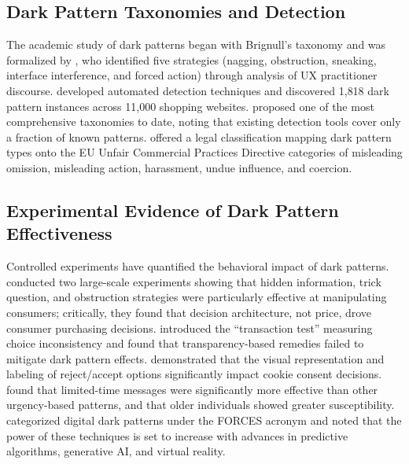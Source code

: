 \documentclass[a4paper]{article}
\begin{document}
\subsection{Dark Pattern Taxonomies and Detection}
The academic study of dark patterns began with Brignull's taxonomy \citep{brignull2010} and was formalized by \citet{gray2018}, who identified five strategies (nagging, obstruction, sneaking, interface interference, and forced action) through analysis of UX practitioner discourse. \citet{mathur2019} developed automated detection techniques and discovered 1{,}818 dark pattern instances across 11{,}000 shopping websites. \citet{li2024} proposed one of the most comprehensive taxonomies to date, noting that existing detection tools cover only a fraction of known patterns. \citet{isola2025} offered a legal classification mapping dark pattern types onto the EU Unfair Commercial Practices Directive categories of misleading omission, misleading action, harassment, undue influence, and coercion.

\subsection{Experimental Evidence of Dark Pattern Effectiveness}
Controlled experiments have quantified the behavioral impact of dark patterns. \citet{luguri2021} conducted two large-scale experiments showing that hidden information, trick question, and obstruction strategies were particularly effective at manipulating consumers; critically, they found that decision architecture, not price, drove consumer purchasing decisions. \citet{bogliacino2026} introduced the ``transaction test'' measuring choice inconsistency and found that transparency-based remedies failed to mitigate dark pattern effects. \citet{berens2024} demonstrated that the visual representation and labeling of reject/accept options significantly impact cookie consent decisions. \citet{koh2023} found that limited-time messages were significantly more effective than other urgency-based patterns, and that older individuals showed greater susceptibility. \citet{fagan2024} categorized digital dark patterns under the FORCES acronym and noted that the power of these techniques is set to increase with advances in predictive algorithms, generative AI, and virtual reality.
\end{document}
